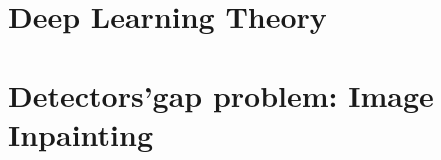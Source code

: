 \documentclass[12pt]{book}
\begin{document}
\pagestyle{fancy}

\fancyhead{}

\renewcommand{\chaptermark}[1]{\markboth{\textsc{#1}}{}}

\frontmatter



%
%


\tableofcontents
\clearpage





\setlength{\parskip}{.7em}

\titlespacing*{\section}{0pt}{.9em}{.8em}
\renewcommand{\baselinestretch}{1.1}








\mainmatter 
\fancyhead[RO]{\leftmark}
\fancyhead[LE]{\textsc{\chaptername~\thechapter}}

\part{Deep Learning Theory}\label{part:theory_background}


\part{Detectors'gap problem: Image Inpainting}\label{part:study}

\end{document}
